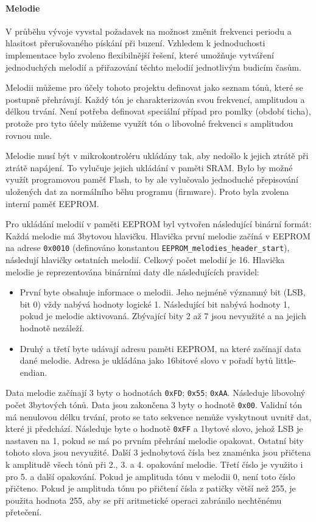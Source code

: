 \paragraph{Melodie}
V průběhu vývoje vyvstal požadavek na možnost změnit frekvenci periodu
a hlasitost přerušovaného pískání při buzení. Vzhledem k jednoduchosti
implementace bylo zvoleno flexibilnější řešení, které umožňuje vytváření
jednoduchých melodií a přiřazování těchto melodií jednotlivým budicím časům.

Melodii můžeme pro účely tohoto projektu definovat jako seznam tónů, které se
postupně přehrávají. Každý tón je charakterizován svou frekvencí, amplitudou
a délkou trvání. Není potřeba definovat speciální případ pro pomlky (období
ticha), protože pro tyto účely můžeme využít tón o libovolné frekvenci
s amplitudou rovnou nule.

Melodie musí být v mikrokontroléru ukládány tak, aby nedošlo k jejich ztrátě
při ztrátě napájení. To vylučuje jejich ukládání v paměti SRAM. Bylo by možné
využít programovou paměť Flash, to by ale vylučovalo jednoduché přepisování
uložených dat za normálního běhu programu (firmware). Proto byla zvolena
interní paměť EEPROM.

Pro ukládání melodií v paměti EEPROM byl vytvořen následující binární formát:
Každá melodie má 3bytovou hlavičku. Hlavička první melodie začíná v EEPROM na
adrese \texttt{0x0010} (definováno konstantou
\verb|EEPROM_melodies_header_start|), následují hlavičky ostatních melodií.
Celkový počet melodií je 16. Hlavička melodie je reprezentována binárními daty
dle následujících pravidel:
\begin{itemize}[nosep]
    \item První byte obsahuje informace o melodii. Jeho nejméně významný bit
        (LSB, bit 0) vždy nabývá hodnoty logické 1. Následující bit nabývá
        hodnoty 1, pokud je melodie aktivovaná. Zbývající bity 2 až 7 jsou
        nevyužité a na jejich hodnotě nezáleží.
    \item Druhý a třetí byte udávají adresu paměti EEPROM, na které začínají
        data dané melodie. Adresa je ukládána jako 16bitové slovo v pořadí bytů
        little-endian.
\end{itemize}

Data melodie začínají 3 byty o hodnotách \texttt{0xFD}; \texttt{0x55};
\texttt{0xAA}. Následuje libovolný počet 3bytových tónů. Data jsou zakončena 3
byty o hodnotě \texttt{0x00}. Validní tón má nenulovou délku trvání, proto se
tato sekvence nemůže vyskytnout uvnitř dat, které ji předchází. Následuje byte
o hodnotě \texttt{0xFF} a 1bytové slovo, jehož LSB je nastaven na 1, pokud se
má po prvním přehrání melodie opakovat. Ostatní bity tohoto slova jsou
nevyužité. Další 3 jednobytová čísla bez znaménka jsou přičtena k amplitudě
všech tónů při 2., 3. a 4. opakování melodie. Třetí číslo je využito i pro 5.
a další opakování. Pokud je amplituda tónu v melodii 0, není toto číslo
přičteno. Pokud je amplituda tónu po přičtení čísla z patičky větší než
\num{255}, je použita hodnota \num{255}, aby se při aritmetické operaci
zabránilo nechtěnému přetečení.

